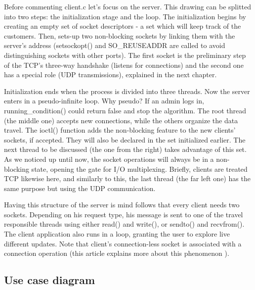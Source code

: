 \documentclass[runningheads]{llncs}
\begin{document}
Before commenting client.c let's focus on the server. This drawing can be splitted into two steps: the initialization stage and the loop. The initialization begins by creating an empty set of socket descriptors - a set which will keep track of the customers. Then, sets-up two non-blocking sockets by linking them with the server's address (setsockopt() and SO\_REUSEADDR are called to avoid distinguishing sockets with other ports). The first socket is the preliminary step of the TCP's three-way handshake (listens for connections) and the second one has a special role (UDP transmissions), explained in the next chapter.

Initialization ends when the process is divided into three threads. Now the server enters in a pseudo-infinite loop. Why pseudo? If an admin logs in, running\_condition() could return false and stop the algorithm. The root thread (the middle one) accepts new connections, while the others organize the data travel. The ioctl() function adds the non-blocking feature to the new clients' sockets, if accepted. They will also be declared in the set initialized earlier. The next thread to be discussed (the one from the right) takes advantage of this set. As we noticed up until now, the socket operations will always be in a non-blocking state, opening the gate for I/O multiplexing. Briefly, clients are treated TCP likewise here, and similarly to this, the last thread (the far left one) has the same purpose but using the UDP communication.

Having this structure of the server is mind follows that every client needs two sockets. Depending on his request type, his message is sent to one of the travel responsible threads using either read() and write(), or sendto() and recvfrom(). The client application also runs in a loop, granting the user to explore live different updates. Note that client's connection-less socket is associated with a connection operation (this article explains more about this phenomenon \cite{udp-connect}).

\subsection{Use case diagram}
\end{document}
